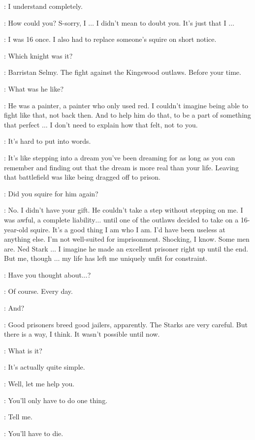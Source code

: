 \JAIME: I understand completely.

\ALTON: How could you? S-sorry, I $\ldots$ I didn't mean to doubt you. It's just that I $\ldots$

\JAIME: I was 16 once. I also had to replace someone's squire on short notice.

\ALTON: Which knight was it?

\JAIME: Barristan Selmy. The fight against the Kingswood outlaws. Before your time.

\ALTON: What was he like?

\JAIME: He was a painter, a painter who only used red. I couldn't imagine being able to fight like that, not back then. And to help him do that, to be a part of something that perfect $\ldots$ I don't need to explain how that felt, not to you.

\ALTON: It's hard to put into words.

\JAIME: It's like stepping into a dream you've been dreaming for as long as you can remember and finding out that the dream is more real than your life. Leaving that battlefield was like being dragged off to prison.

\ALTON: Did you squire for him again?

\JAIME: No. I didn't have your gift. He couldn't take a step without stepping on me. I was awful, a complete liability$\ldots$ until one of the outlaws decided to take on a 16-year-old squire. It's a good thing I am who I am. I'd have been useless at anything else. I'm not well-suited for imprisonment. Shocking, I know. Some men are. Ned Stark $\ldots$ I imagine he made an excellent prisoner right up until the end. But me, though $\ldots$ my life has left me uniquely unfit for constraint.

\ALTON: Have you thought about$\ldots$?

\JAIME: Of course. Every day.

\ALTON: And?

\JAIME: Good prisoners breed good jailers, apparently. The Starks are very careful. But there is a way, I think. It wasn't possible until now.

\ALTON: What is it?

\JAIME: It's actually quite simple.

\ALTON: Well, let me help you.

\JAIME: You'll only have to do one thing.

\ALTON: Tell me.

\JAIME:  You'll have to die.

